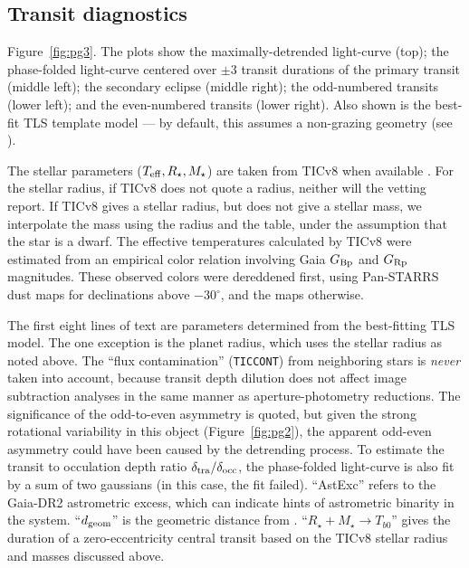 \documentclass[12pt,twocolumn,tighten]{aastex62}
\begin{document}
\subsection{Transit diagnostics}
\label{sec:pg3}

Figure~\ref{fig:pg3}.
The plots show the maximally-detrended light-curve (top); the
phase-folded light-curve centered over $\pm3$ transit durations of the
primary transit (middle left); the secondary eclipse (middle right);
the odd-numbered transits (lower left); and the even-numbered transits
(lower right).
Also shown is the best-fit TLS template model --- by default, this
assumes a non-grazing geometry (see \citealt{hippke_TLS_2019}).

The stellar parameters ($T_{\rm eff}, R_\star, M_\star$) are taken
from TICv8 when available \citep{stassun_TIC8_2019}.  For the stellar
radius, if TICv8 does not quote a radius, neither will the vetting
report.  If TICv8 gives a stellar radius, but does not give
a stellar mass, we interpolate the mass using the radius and the 
\citet{pecaut_intrinsic_2013}
table, under the assumption that the star is a dwarf.
The effective temperatures calculated by TICv8 were estimated from an empirical
color relation involving Gaia $G_{\rm Bp}$ and $G_{\rm Rp}$ magnitudes.  These
observed colors were dereddened first, using Pan-STARRS dust maps
\citep{green_galactic_2018} for declinations above $-30^\circ$, and the
\citet{schlegel_maps_1998} maps otherwise.

The first eight lines of text are parameters determined from the
best-fitting TLS model.  The one exception is the planet radius, which
uses the stellar radius as noted above.  The ``flux contamination''
(\texttt{TICCONT}) from neighboring stars is {\it never} taken into
account, because transit depth dilution does not affect image
subtraction analyses in the same manner as aperture-photometry
reductions.  The significance of the odd-to-even asymmetry is quoted,
but given the strong rotational variability in this object
(Figure~\ref{fig:pg2}), the apparent odd-even asymmetry could have
been caused by the detrending process.  To estimate the transit to
occulation depth ratio $\delta_{\rm tra}/\delta_{\rm occ}$, the
phase-folded light-curve is also fit by a sum of two gaussians (in
this case, the fit failed).  ``AstExc'' refers to the Gaia-DR2
astrometric excess, which can indicate hints of astrometric binarity
in the system.  ``$d_{\rm geom}$'' is the geometric distance from
\citet{bailer-jones_distances_2018}.  ``$R_\star + M_\star \rightarrow
T_{b0}$'' gives the duration of a zero-eccentricity central transit
based on the TICv8 stellar radius and masses discussed above.
\end{document}
